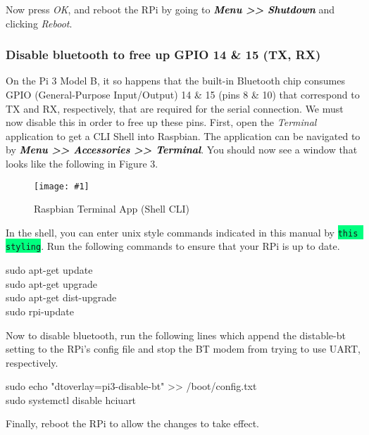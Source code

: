 \documentclass{article}
\newcommand*{\myfont}{\fontfamily{pcr}\selectfont}
\newcommand{\codei}[1]{\colorbox{SpringGreen}{\texttt{#1}}} %
\newcommand{\codeb}[2]{
  \begin{tcolorbox}[width=\textwidth,colback={SpringGreen},title={#1},colbacktitle=DarkGreen,coltitle=SpringGreen]
    \myfont
    #2
  \end{tcolorbox}
} %
\newcommand{\loc}[1]{\textit{\textcolor{Black}{\textbf{#1}}}} %
\newcommand{\imagefig}[2]{
    \begin{figure}[H]
        \centering
        \texttt{[image: \#1]}
        \caption{#2}
    \end{figure}
}
\begin{document}
    Now press \textit{OK}, and reboot the RPi by going to \loc{Menu >> Shutdown} and clicking \textit{Reboot}.

    \subsubsection{Disable bluetooth to free up GPIO 14 \& 15 (TX, RX)}
    On the Pi 3 Model B, it so happens that the built-in Bluetooth chip consumes GPIO (General-Purpose Input/Output) 14 \& 15 (pins 8 \& 10) that correspond to TX and RX, respectively, that are required for the serial connection. We must now disable this in order to free up these pins. First, open the \textit{Terminal} application to get a CLI Shell into Raspbian. The application can be navigated to by \loc{Menu >> Accessories >> Terminal}. You should now see a window that looks like the following in Figure 3.
    \imagefig{screen3.png}{Raspbian Terminal App (Shell CLI)}

    In the shell, you can enter unix style commands indicated in this manual by \codei{this styling}. Run the following commands to ensure that your RPi is up to date.

    \codeb{Update environment}
    {
      sudo apt-get update \\
      sudo apt-get upgrade \\
      sudo apt-get dist-upgrade \\
      sudo rpi-update
    }

    Now to disable bluetooth, run the following lines which append the distable-bt setting to the RPi's config file and stop the BT modem from trying to use UART, respectively.

    \codeb{Disable bluetooth}
    {
      sudo echo "dtoverlay=pi3-disable-bt" >> /boot/config.txt \\
      sudo systemctl disable hciuart
    }

    Finally, reboot the RPi to allow the changes to take effect.
\end{document}
